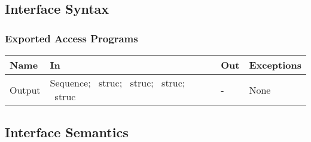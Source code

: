 \documentclass[12pt, titlepage]{article}
\begin{document}
\subsection{Interface Syntax}

\subsubsection{Exported Access Programs}
\renewcommand*{\arraystretch}{1.5}
\begin{tabular}{| p{} | p{} | 
p{} | p{} |} \hline 

  \textbf{Name} & \textbf{In} & \textbf{Out} & \textbf{Exceptions}
  \\ \hline

  Output & Sequence; ~\newline struc; ~\newline struc; ~\newline struc;
  ~\newline struc & - & None \\ \hline

\end{tabular}

\subsection{Interface Semantics}
\end{document}
